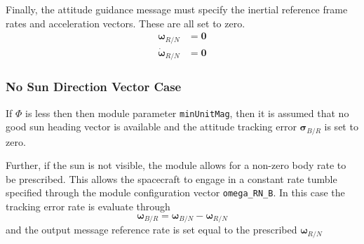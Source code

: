 Finally, the attitude guidance message must specify the inertial reference frame rates and acceleration vectors.  These are all set to zero.
\begin{align}
	\bm\omega_{R/N} &= \bm 0 \\
	\dot{\bm \omega}_{R/N} &= \bm 0
\end{align}

\subsubsection{No Sun Direction Vector Case}
 If $\Phi$ is less then then module parameter {\tt minUnitMag}, then it is assumed that no good sun heading vector is available and the attitude tracking error $\bm\sigma_{B/R}$ is set to zero.   
 
 Further, if the sun is not visible, the module allows for a non-zero body rate to be prescribed.  This allows the spacecraft to engage in a constant rate tumble specified through the module configuration vector {\tt omega\_RN\_B}.  In this case the tracking error rate is evaluate through
 \begin{equation}
 	\label{eq:ssp:6}
	\bm\omega_{B/R} = \bm\omega_{B/N} - \bm\omega_{R/N}
 \end{equation}
 and the output message reference rate is set equal to the prescribed $\bm\omega_{R/N}$

 
 
 
 
 
 